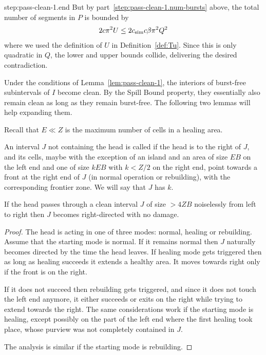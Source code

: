 \documentclass[11pt]{memoir}
\theoremstyle{definition} %
\renewcommand{\le}{\leq}
\def\B{B}
\def\U{U}
\newcommand{\E}{E}
\newcommand{\passno}{\pi}
\newcommand{\Q}{Q}
\newcommand{\Z}{Z}
\newcommand{\cns}[1]{c_{\textrm{\upshape #1}}}
\newcommand{\CSim}{\cns{sim}}
\begin{document}
\begin{Proof}
\begin{step+}{step:pass-clean-1.end}
But by part~\ref{step:pass-clean-1.num-bursts} above, the total number of segments in \( P \)
is bounded by 
\begin{align*}
  2 c \passno^{2}\U\le 2\CSim c\beta \passno^{2}\Q^{2}
\end{align*}
where we used the definition of \( \U \) in Definition~\ref{def:Tu}.
Since this is only quadratic in \( \Q \), the lower and upper bounds collide, delivering the desired
contradiction.
\end{step+}
\end{Proof}

Under the conditions of Lemma~\ref{lem:pass-clean-1}, the interiors of
burst-free subintervals of \( I \) become clean.
By the Spill Bound property, they essentially also remain clean as long as they remain burst-free.
The following two lemmas will help expanding them.

Recall that \( \E \ll \Z \) is the maximum number of cells in a healing area.

\begin{definition}\label{def:directed}
An interval \( J \) not containing the head is called 
if the head is to the right of \( J \),
and its cells, maybe with the exception of an island and an area of size \( \E\B \) on the left end
and one of size \( k\E\B \) with \( k<\Z/2 \) on the right end,
point towards a front at the right end of \( J \) (in normal operation or rebuilding),
with the corresponding frontier zone.
We will say that \( J \) has  \( k \).
\end{definition}

\begin{lemma}\label{lem:make-directed}
  If the head passes through a clean interval \( J \) of size \( >4\Z\B \) noiselessly
 from left to right then \( J \) becomes right-directed with no damage.
\end{lemma}
\begin{proof}
  The head is acting in one of three modes: normal, healing or rebuilding.
  Assume that the starting mode is normal.
  If it remains normal then \( J \) naturally becomes directed by the time the head leaves.
  If healing mode gets triggered then as long as healing succeeds it extends a healthy area.
  It moves towards right only if the front is on the right.

  If it does not succeed then rebuilding gets triggered,
  and since it does not touch the left end anymore, it either succeeds or exits on the right
  while trying to extend towards the right.
 The same considerations work if the starting mode is healing, except possibly on
 the part of the left end where the first healing took place, whose purview
 was not completely contained in \( J \).
 
The analysis is similar if the starting mode is rebuilding.
\end{proof}
\end{document}
